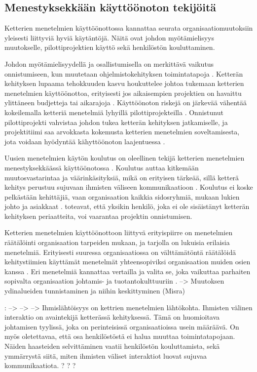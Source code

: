 \subsection{Menestyksekkään käyttöönoton tekijöitä}

Ketterien menetelmien käyttöönottossa kannattaa seurata organisaatiomuutoksiin
yleisesti liittyviä hyviä käytäntöjä. Näitä ovat johdon myötämielisyys
muutokselle, pilottiprojektien käyttö sekä henkilöstön kouluttaminen.

Johdon myötämielisyydellä ja osallistumisella on merkittävä vaikutus
onnistumiseen, kun muutetaan ohjelmistokehityksen toimintatapoja
. Ketterän kehityksen lupaama tehokkuuden kasvu
houkuttelee johtoa tukemaan ketterien menetelmien käyttöönottoa, erityisesti jos
aikaisempien projektien on havaittu ylittäneen budjetteja tai aikarajoja
. Käyttöönoton riskejä on järkevää vähentää kokeilemalla
ketteriä menetelmiä lyhyillä pilottiprojekteilla .
Onnistunut pilottiprojekti vahvistaa johdon tukea ketterän kehityksen
jatkamiselle, ja projektitiimi saa arvokkasta kokemusta ketterien menetelmien
soveltamisesta, jota voidaan hyödyntää kähyttöönoton laajentuessa
.

Uusien menetelmien käytön koulutus on oleellinen tekijä ketterien menetelmien
menestyksekkäässä käyttöönotossa . Koulutus auttaa
kitkemään muutosvastarintaa ja väärinkäsityksiä, mikä on erityisen tärkeää,
sillä ketterä kehitys perustuu sujuvaan ihmisten väliseen kommunikaatioon
. Koulutus ei koske pelkästään kehittäjiä, vaan
organisaation kaikkia sidosryhmiä, mukaan lukien johto ja asiakkaat
.  toteavat, että yksikin henkilö, joka ei
ole sisäistänyt ketterän kehityksen periaatteita, voi vaarantaa projektin
onnistumisen.

Ketterien menetelmien käyttöönottoon liittyvä erityispiirre on menetelmien
räätälöinti organisaation tarpeiden mukaan, ja tarjolla on lukuisia erilaisia
menetelmiä. Erityisesti suuressa organisaatiossa on välttämätöntä räätälöidä
kehitystiimien käyttämät menetelmät yhteensopiviksi organisaation muiden osien
kanssa . Eri menetelmiä kannattaa vertailla ja valita se,
joka vaikuttaa parhaiten sopivalta organisaation johtamis- ja
tuotantokulttuuriin .
--> Muutoksen ydinalueiden tunnistaminen ja niihin keskittyminen (Misra)

: --> -->
--> Ihmislähtöisyys on kettrien menetelmien lähtökohta. Ihmisten välinen
interaktio on avaintekijä ketterässä kehityksessä. Tämä on huomioitava
johtamisen tyylissä, joka on perinteisissä organisaatioissa usein määräävä. On
myös oletettavaa, että osa henkilöstöstä ei halua muuttaa toimintatapojaan.
Näiden haasteiden selvittäminen vaatii henkilöstön kouluttamista, sekä
ymmärrystä siitä, miten ihmisten väliset interaktiot luovat sujuvaa
kommunikaatiota. ? ? ?

